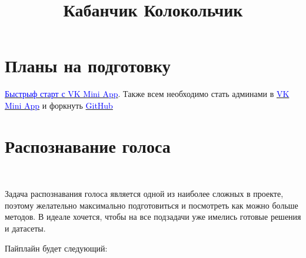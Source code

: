 \documentclass[11pt]{article}
\begin{document}
\title{Кабанчик Колокольчик}
\maketitle

\section*{Планы на подготовку}

\href{https://vk.com/@vkappsdev-quick-start}{\textcolor{blue}{Быстрыф старт с VK Mini App}}. Также всем необходимо стать админами в \href{vk.com/app7119135}{\textcolor{blue}{VK Mini App}} и форкнуть \href{https://github.com/maximzubkov/on_hack}{\textcolor{blue}{GitHub}}
\section{Распознавание голоса}

\

Задача распознавания голоса является одной из наиболее сложных в проекте, поэтому желательно максимально подготовиться и посмотреть как можно больше методов. В идеале хочется, чтобы на все подзадачи уже имелись готовые решения и датасеты.

Пайплайн будет следующий:
\end{document}
